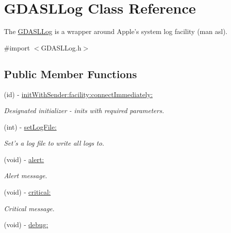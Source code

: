 \hypertarget{interface_g_d_a_s_l_log}{
\section{GDASLLog Class Reference}
\label{interface_g_d_a_s_l_log}
}


The \hyperlink{interface_g_d_a_s_l_log}{GDASLLog} is a wrapper around Apple's system log facility (man asl).  


{\ttfamily \#import $<$GDASLLog.h$>$}\subsection*{Public Member Functions}
\begin{DoxyCompactItemize}
\item 
(id) -\/ \hyperlink{interface_g_d_a_s_l_log_ac9553b0e41554a4d75a35f6bd5280956}{initWithSender:facility:connectImmediately:}
\begin{DoxyCompactList}\small\item\em Designated initializer -\/ inits with required parameters. \item\end{DoxyCompactList}\item 
(int) -\/ \hyperlink{interface_g_d_a_s_l_log_a60c2903d8fb00b34fafe5c2c1965f811}{setLogFile:}
\begin{DoxyCompactList}\small\item\em Set's a log file to write all logs to. \item\end{DoxyCompactList}\item 
\hypertarget{interface_g_d_a_s_l_log_a1f3385d376fb7243873adf46b79facf2}{
(void) -\/ \hyperlink{interface_g_d_a_s_l_log_a1f3385d376fb7243873adf46b79facf2}{alert:}}
\label{interface_g_d_a_s_l_log_a1f3385d376fb7243873adf46b79facf2}

\begin{DoxyCompactList}\small\item\em Alert message. \item\end{DoxyCompactList}\item 
\hypertarget{interface_g_d_a_s_l_log_a98676521adaed96dbd633ec3ebd255f8}{
(void) -\/ \hyperlink{interface_g_d_a_s_l_log_a98676521adaed96dbd633ec3ebd255f8}{critical:}}
\label{interface_g_d_a_s_l_log_a98676521adaed96dbd633ec3ebd255f8}

\begin{DoxyCompactList}\small\item\em Critical message. \item\end{DoxyCompactList}\item 
\hypertarget{interface_g_d_a_s_l_log_ae3d6cd86743062c53dd2a2b741242014}{
(void) -\/ \hyperlink{interface_g_d_a_s_l_log_ae3d6cd86743062c53dd2a2b741242014}{debug:}}
\label{interface_g_d_a_s_l_log_ae3d6cd86743062c53dd2a2b741242014}


\end{DoxyCompactItemize}
